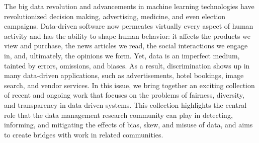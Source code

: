 \documentclass[11pt]{article}
\begin{document}
The big data revolution and advancements in machine learning
technologies have revolutionized decision making, advertising,
medicine, and even election campaigns. Data-driven software now
permeates virtually every aspect of human activity and has the
ability to shape human behavior: it affects the products we view
and purchase, the news articles we read, the social interactions we
engage in, and, ultimately, the opinions we form. Yet, data is an
imperfect medium, tainted by errors, omissions, and biases. As a
result, discrimination shows up in many data-driven applications,
such as advertisements, hotel bookings, image search, and vendor
services. In this issue, we bring together an exciting collection
of recent and ongoing work that focuses on the problems of
fairness, diversity, and transparency in data-driven systems. This
collection highlights the central role that the data management
research community can play in detecting, informing, and mitigating
the effects of bias, skew, and misuse of data, and aims to create
bridges with work in related communities.
\end{document}
